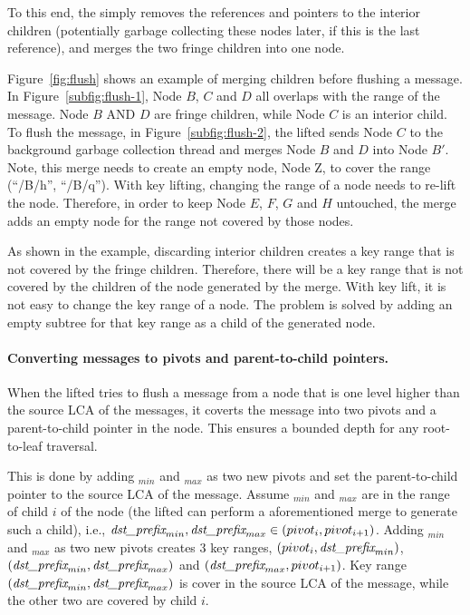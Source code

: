 To this end, the \bedag simply removes the references and pointers to the
interior children (potentially garbage collecting these nodes later, if this is
the last reference),
and merges the two fringe children into one node.

Figure~\ref{fig:flush} shows an example of merging children before flushing a
\goto message.
In Figure~\ref{subfig:flush-1}, Node $B$, $C$ and $D$ all overlaps with the
range of the \goto message.
Node $B$ AND $D$ are fringe children, while Node $C$ is an interior child.
To flush the \goto message, in Figure~\ref{subfig:flush-2}, the lifted \bedag
sends Node $C$ to the background garbage collection thread and merges Node $B$
and $D$ into Node $B'$.
Note, this merge needs to create an empty node, Node Z, to cover the range
(``/B/h'', ``/B/q'').
With key lifting, changing the range of a node needs to re-lift the node.
Therefore, in order to keep Node $E$, $F$, $G$ and $H$ untouched, the merge
adds an empty node for the range not covered by those nodes.

As shown in the example, discarding interior children creates a key range that
is not covered by the fringe children.
Therefore, there will be a key range that is not covered by the children of the
node generated by the merge.
With key lift, it is not easy to change the key range of a node.
The problem is solved by adding an empty subtree for that key range as a child
of the generated node.

\paragraph{Converting \goto messages to pivots and parent-to-child pointers.}
When the lifted \bedag tries to flush a \goto message from a node that is one
level higher than the source LCA of the \goto messages, it coverts the \goto
message into two pivots and a parent-to-child pointer in the node.
This ensures a bounded depth for any root-to-leaf traversal.

This is done by adding \dpre$_{min}$ and \dpre$_{max}$ as two new pivots and
set the parent-to-child pointer to the source LCA of the \goto message.
Assume \dpre$_{min}$ and \dpre$_{max}$ are in the range of child $i$ of the node
(the lifted \bedag can perform a aforementioned merge to generate such a child),
i.e., $\textit{dst\_prefix}_{min}, \textit{dst\_prefix}_{max} \in (pivot_{i},pivot_{i+1})$.
Adding \dpre$_{min}$ and \dpre$_{max}$ as two new pivots creates 3 key ranges,
$(pivot_{i},\textit{dst\_prefix}_{min})$, $(\textit{dst\_prefix}_{min},\textit{dst\_prefix}_{max})$ and
$(\textit{dst\_prefix}_{max}, pivot_{i+1})$.
Key range $(\textit{dst\_prefix}_{min},\textit{dst\_prefix}_{max})$ is cover in the source LCA of the \goto
message, while the other two are covered by child $i$.

